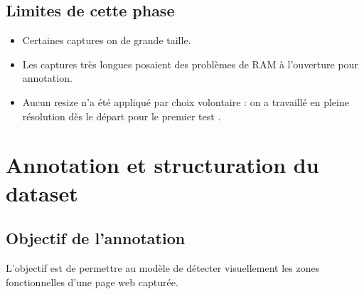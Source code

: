 \documentclass[12pt,a4paper]{report}
\begin{document}
\section{Limites de cette phase}

\begin{itemize}
\item Certaines captures on de grande taille.

\item Les captures très longues posaient des problèmes de RAM à l'ouverture pour annotation.
\item Aucun resize n'a été appliqué par choix volontaire : on a travaillé en pleine résolution dès le départ pour le premier test .
\end{itemize}

\chapter{ Annotation et structuration du dataset}

\section{Objectif de l'annotation}

L'objectif est de permettre au modèle de détecter visuellement les zones fonctionnelles d'une page web capturée.
\end{document}

